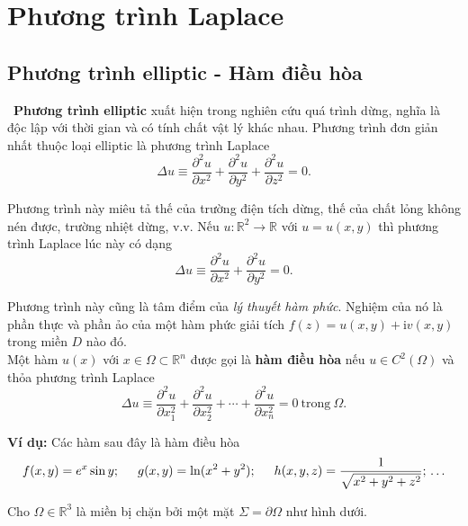 \documentclass[10pt, a4paper]{article}
\begin{document}
	\section{Phương trình Laplace}
	\subsection{Phương trình elliptic - Hàm điều hòa}
	\vspace{2mm}
	\quad\,\,\,\textbf{\color{red}Phương trình elliptic} xuất hiện trong nghiên cứu quá trình dừng, nghĩa là độc lập với thời gian và có tính chất vật lý khác nhau. Phương trình đơn giản nhất thuộc loại elliptic là phương trình Laplace $$\Delta u\equiv\frac{\partial^2u}{\partial x^2}+\frac{\partial^2u}{\partial y^2}+\frac{\partial^2u}{\partial z^2}=0.$$
	
	Phương trình này miêu tả thế của trường điện tích dừng, thế của chất lỏng không nén được, trường nhiệt dừng, v.v. Nếu $u:\mathbb R^2\to\mathbb R$ với $u=u(x,y)$ thì phương trình Laplace lúc này có dạng $$\Delta u\equiv\frac{\partial^2u}{\partial x^2}+\frac{\partial^2u}{\partial y^2}=0.$$
	
	Phương trình này cũng là tâm điểm của \textit{lý thuyết hàm phức}. Nghiệm của nó là phần thực và phần ảo của một hàm phức giải tích $f(z)=u(x,y)+\mathrm iv(x,y)$ trong miền $D$ nào đó.\\
	
	Một hàm $u(x)$ với $x\in\Omega\subset\mathbb R^n$ được gọi là \textbf{\color{red}hàm điều hòa} nếu $u\in C^2(\Omega)$ và thỏa phương trình Laplace $$\Delta u\equiv\frac{\partial^2u}{\partial x_1^2}+\frac{\partial^2u}{\partial x_2^2}+\cdots+\frac{\partial^2u}{\partial x_n^2}=0~\text{trong}~\Omega.$$
	
	\textbf{Ví dụ:} Các hàm sau đây là hàm điều hòa $$f(x,y)=e^x\sin y;\hspace{0.5cm}g(x,y)=\ln(x^2+y^2);\hspace{0.5cm}h(x,y,z)=\frac{1}{\sqrt{x^2+y^2+z^2}};\,\ldots$$
	
	Cho $\Omega\in\mathbb R^3$ là miền bị chặn bởi một mặt $\Sigma=\partial\Omega$ như hình dưới.\\
	
\end{document}
